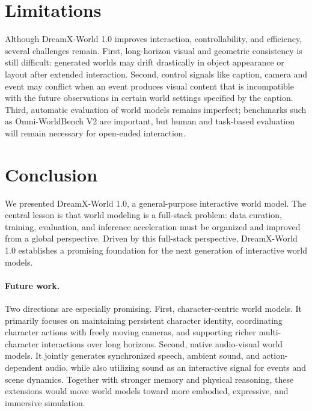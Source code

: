 \documentclass{llmxive}
\providecommand{\method}{DreamX-World 1.0}
\providecommand{\eprope}{E-PRoPE}
\begin{document}
\section{Limitations}

Although \method{} improves interaction, controllability, and efficiency,
several challenges remain.
First, long-horizon visual and geometric consistency is still difficult:
generated worlds may drift drastically in object appearance or layout
after extended interaction.
Second, control signals like caption, camera and event may conflict
when an event produces visual content that is incompatible with the future observations in certain world settings specified by the caption.
Third, automatic evaluation of world models remains imperfect;
benchmarks such as Omni-WorldBench V2 are important,
but human and task-based evaluation will remain necessary for open-ended interaction.

\section{Conclusion}

We presented \method{},
a general-purpose interactive world model.
The central lesson is that world modeling is a full-stack problem: data curation, training, evaluation, and inference acceleration must be organized and improved from a global perspective. Driven by this full-stack perspective, \method{} establishes a promising foundation for the next generation of interactive world models.

\paragraph{Future work.}
Two directions are especially promising.
First, character-centric world models.
It primarily focuses on maintaining persistent character
identity, coordinating character actions with freely moving cameras, and supporting
richer multi-character interactions over long horizons.
Second, native audio-visual world models. It jointly generates synchronized
speech, ambient sound, and action-dependent audio, while also utilizing sound as an
interactive signal for events and scene dynamics.
Together with stronger memory and physical reasoning, these extensions would
move world models toward more embodied, expressive, and immersive simulation.
\end{document}
